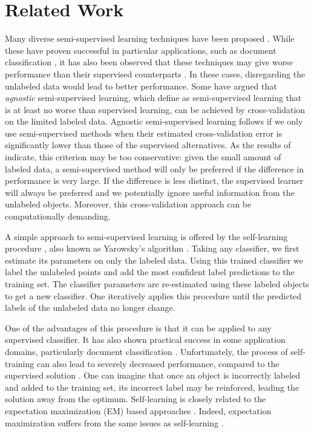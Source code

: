 \documentclass[smallcondensed]{svjour3}
\begin{document}
\section{Related Work} \label{section:relatedwork}
Many diverse semi-supervised learning techniques have been proposed \cite{Chapelle2006,Zhu2009}. While these have proven successful in  particular applications, such as document classification \cite{Nigam2000}, it has also been observed that these techniques may give worse performance than their supervised counterparts \cite{Cozman2003,Cozman2006}. In these cases, disregarding the unlabeled data would lead to better performance. Some \cite{Goldberg2009,Wang2007a} have argued that \emph{agnostic} semi-supervised learning, which \cite{Goldberg2009} define as semi-supervised learning that is at least no worse than supervised learning, can be achieved by cross-validation on the limited labeled data. Agnostic semi-supervised learning follows if we only use semi-supervised methods when their estimated cross-validation error is significantly lower than those of the supervised alternatives. As the results of  \cite{Goldberg2009} indicate, this criterion may be too conservative: given the small amount of labeled data, a semi-supervised method will only be preferred if the difference in performance is very large. If the difference is less distinct, the supervised learner will always be preferred and we potentially ignore useful information from the unlabeled objects. Moreover, this cross-validation approach can be computationally demanding.

A simple approach to semi-supervised learning is offered by the self-learning procedure \cite{McLachlan1975b}, also known as Yarowsky's algorithm \cite{Yarowsky1995,Abney2004}. Taking any classifier, we first estimate its parameters on only  the labeled data. Using this trained classifier we label the unlabeled points and add the most confident label predictions to the training set. The classifier parameters are re-estimated using these labeled objects to get a new classifier. One iteratively applies this procedure until the predicted labels of the unlabeled data no longer change.

One of the advantages of this procedure is that it can be applied to any supervised classifier. It has also shown practical success in some application domains, particularly document classification \cite{Nigam2000,Yarowsky1995}. Unfortunately, the process of self-training can also lead to severely decreased performance, compared to the supervised solution \cite{Cozman2003,Cozman2006}. One can imagine that once an object is incorrectly labeled and added to the training set, its incorrect label may be reinforced, leading the solution away from the optimum. Self-learning is closely related to the expectation maximization (EM) based approaches \cite{Abney2004}. Indeed, expectation maximization suffers from the same issues as self-learning \cite{Zhu2009}.
\end{document}
